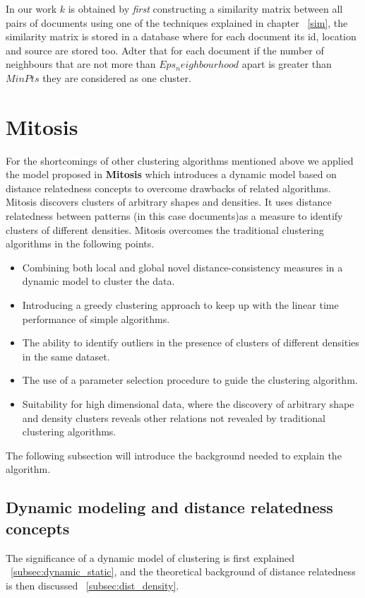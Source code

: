 In our work $k$ is obtained by \textit{first} constructing a similarity matrix between all pairs of documents using one of the techniques explained in chapter ~\ref{sim}, the similarity matrix is stored in a database where for each document its id, location and source are stored too. Adter that for each document if the number of neighbours that are not more than $Eps_neighbourhood$ apart is greater than $MinPts$ they are considered as one cluster.

\section{Mitosis}\label{mitosis}
For the shortcomings of other clustering algorithms mentioned above we applied the model proposed in \textbf{Mitosis} \citep{Mitosis_1} which introduces a dynamic model based on distance relatedness concepts to overcome drawbacks of related algorithms. Mitosis discovers clusters of arbitrary shapes and densities. It uses distance relatedness between patterns (in this case documents)as a measure to identify clusters of different densities.
Mitosis overcomes the traditional clustering algorithms in the following points.
\begin{itemize}
\item{Combining both local and global novel distance-consistency measures in a dynamic model to cluster the data.}
\item{Introducing a greedy clustering approach to keep up with the linear time performance of simple algorithms.}
\item{The ability to identify outliers in the presence of clusters of different densities in the same dataset.}
\item{The use of a parameter selection procedure to guide the clustering algorithm.}
\item{Suitability for high dimensional data, where the discovery of arbitrary shape and density clusters reveals other relations not revealed by traditional clustering algorithms.}
\end{itemize}
The following subsection will introduce the background needed to explain the algorithm.
\subsection{Dynamic modeling and distance relatedness concepts}\label{sec:background}

The significance of a dynamic model of clustering is first explained ~\ref{subsec:dynamic_static}, and the theoretical background of distance relatedness is then discussed ~\ref{subsec:dist_density}.

